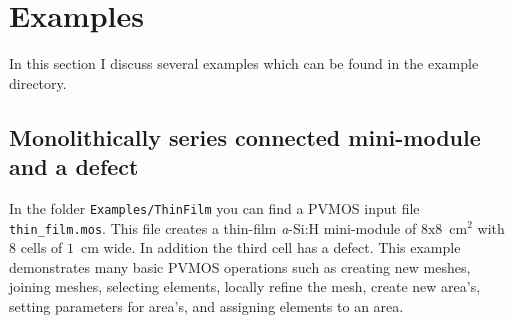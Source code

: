 \documentclass[noshowpacs,preprintnumbers,amsmath,amssymb, letter]{revtex4}
\newcommand{\Un}[2]{\mbox{$\mathrm{#1}$ $\mathrm{#2}$}}
\newcommand{\ASI}{\lowercase{\emph{a}}-S\lowercase{i}:H}
\begin{document}
\section{Examples}
In this section I discuss several examples which can be found in the example directory.
\subsection{Monolithically series connected mini-module and a defect}
In the folder \texttt{Examples/ThinFilm} you can find a PVMOS input file \texttt{thin\_film.mos}. This file creates a thin-film \ASI{} mini-module of \Un{8x8}{cm^2} with 8 cells of \Un{1}{cm} wide. In addition the third cell has a defect. This example demonstrates many basic PVMOS operations such as creating new meshes, joining meshes, selecting elements, locally refine the mesh, create new area's, setting parameters for area's, and assigning elements to an area. 
\end{document}
